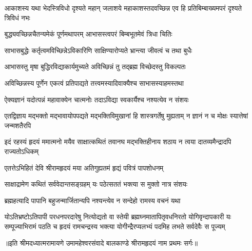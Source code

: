 \threelineshloka
{आकाशस्य यथा भेदस्त्रिविधो दृश्यते महान्}
{जलाशये महाकाशस्तदवच्छिन्न एव हि}
{प्रतिबिम्बाख्यमपरं दृश्यते त्रिविधं नभः} %

\twolineshloka
{बुद्ध्यवच्छिन्नचैतन्यमेकं पूर्णमथापरम्}
{आभासस्त्वपरं बिम्बभूतमेवं त्रिधा चितिः} %

\twolineshloka
{साभासबुद्धेः कर्तृत्वमविच्छिन्नेऽविकारिणि}
{साक्षिण्यारोप्यते भ्रान्त्या जीवत्वं च तथा बुधैः} %

\twolineshloka
{आभासस्तु मृषा बुद्धिरविद्याकार्यमुच्यते}
{अविच्छिन्नं तु तद्ब्रह्म विच्छेदस्तु विकल्पतः} %

\twolineshloka
{अविच्छिन्नस्य पूर्णेन एकत्वं प्रतिपाद्यते}
{तत्त्वमस्यादिवाक्यैश्च साभासस्याहमस्तथा} %

\twolineshloka
{ऐक्यज्ञानं यदोत्पन्नं महावाक्येन चात्मनोः}
{तदाऽविद्या स्वकार्यैश्च नश्यत्येव न संशयः} %

\threelineshloka
{एतद्विज्ञाय मद्भक्तो मद्भावायोपपद्यते}
{मद्भक्तिविमुखानां हि शास्त्रगर्तेषु मुह्यताम्}
{न ज्ञानं न च मोक्षः स्यात्तेषां जन्मशतैरपि} %

\fourlineindentedshloka
{इदं रहस्यं हृदयं ममात्मनो}
{मयैव साक्षात्कथितं तवानघ}
{मद्भक्तिहीनाय शठाय न त्वया}
{दातव्यमैन्द्रादपि राज्यतोऽधिकम्} %


\twolineshloka
{एतत्तेऽभिहितं देवि श्रीरामहृदयं मया}
{अतिगुह्यतमं हृद्यं पवित्रं पापशोधनम्} %

\twolineshloka
{साक्षाद्रामेण कथितं सर्ववेदान्तसङ्ग्रहम्}
{यः पठेत्सततं भक्त्या स मुक्तो नात्र संशयः} %

\twolineshloka
{ब्रह्महत्यादि पापानि बहुजन्मार्जितान्यपि}
{नश्यन्त्येव न सन्देहो रामस्य वचनं यथा} %

\fourlineindentedshloka
{योऽतिभ्रष्टोऽतिपापी परधनपरदारेषु नित्योद्यतो वा}
{स्तेयी ब्रह्मघ्नमातापितृवधनिरतो योगिवृन्दापकारी}
{यः सम्पूज्याभिरामं पठति च हृदयं रामचन्द्रस्य भक्त्या}
{योगीन्द्रैरप्यलभ्यं पदमिह लभते सर्वदेवैः स पूज्यम्} %

{॥इति श्रीमदध्यात्मरामायणे उमामहेश्वरसंवादे बालकाण्डे
श्रीरामहृदयं नाम प्रथमः सर्गः॥}
